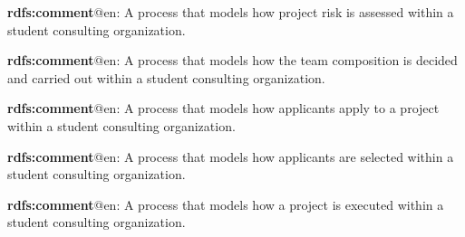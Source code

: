 \documentclass[a4paper, DIV=13, BCOR=0cm]{scrbook}
\begin{document}
\begin{mdframed}[style=onto-3, frametitle={Project Risk Assessment Process}]
	{%
		\begin{compactitem}
			\item \textbf{rdfs:comment}@en: A process that models how project risk is assessed within a student consulting organization.
		\end{compactitem}
	} %
\end{mdframed}

\begin{mdframed}[style=onto-3, frametitle={Project Team Making Process}]
	{%
		\begin{compactitem}
			\item \textbf{rdfs:comment}@en: A process that models how the team composition is decided and carried out within a student consulting organization.
		\end{compactitem}
	} %
\end{mdframed}

\begin{mdframed}[style=onto-4, frametitle={Project Team Application Process}]
	{%
		\begin{compactitem}
			\item \textbf{rdfs:comment}@en: A process that models how applicants apply to a project within a student consulting organization.
		\end{compactitem}
	} %
\end{mdframed}

\begin{mdframed}[style=onto-4, frametitle={Project Team Selection Process}]
	{%
		\begin{compactitem}
			\item \textbf{rdfs:comment}@en: A process that models how applicants are selected within a student consulting organization.
		\end{compactitem}
	} %
\end{mdframed}

\begin{mdframed}[style=onto-2, frametitle={Project Execution Process}]
	{%
		\begin{compactitem}
			\item \textbf{rdfs:comment}@en: A process that models how a project is executed within a student consulting organization.
		\end{compactitem}
	} %
\end{mdframed}
\end{document}
